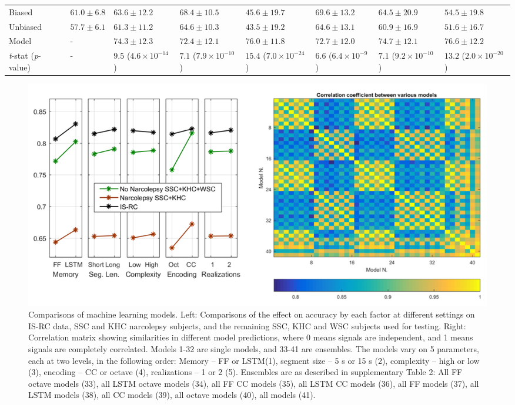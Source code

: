 \begin{landscape}
\begin{table}
\begin{tabular}{@{}llllllll@{}}
        \quad Biased                       & $61.0\pm6.8$ & $63.6\pm12.2$          & $68.4\pm10.5$          & $45.6\pm19.7$           & $69.6\pm13.2$         & $64.5\pm20.9$          & $54.5\pm19.8$           \\
        \quad Unbiased                     & $57.7\pm6.1$ & $61.3\pm11.2$          & $64.6\pm10.3$          & $43.5\pm19.2$           & $64.6\pm13.1$         & $60.9\pm16.9$          & $51.6\pm16.7$           \\
        \quad Model                        & -            & $74.3\pm12.3$          & $72.4\pm12.1$          & $76.0\pm11.8$           & $72.7\pm12.0$         & $74.7\pm12.1$          & $76.6\pm12.2$           \\
        \textit{t}-stat (\textit{p}-value) & -            & $9.5$ ($4.6\times10^{-14}$) & $7.1$ ($7.9\times10^{-10}$) & $15.4$ ($7.0\times10^{-24}$) & $6.6$ ($6.4\times10^{-9}$) & $7.1$ ($9.2\times10^{-10}$) & $13.2$ ($2.0\times10^{-20}$) \\ \bottomrule
    \end{tabular}
\end{table}
\end{landscape}

\begin{figure}
    \centering
    \includegraphics[width=\textwidth]{figures/paper-iii/SuppFigure_1.png}
    \caption[Comparisons of machine learning models]{Comparisons of machine learning models. Left: Comparisons of the effect on accuracy by each factor at different settings on IS-RC data, SSC and KHC narcolepsy subjects, and the remaining SSC, KHC and WSC subjects used for testing. Right: Correlation matrix showing similarities in different model predictions, where 0 means signals are independent, and 1 means signals are completely correlated. Models 1-32 are single models, and 33-41 are ensembles. The models vary on 5 parameters, each at two levels, in the following order: Memory – FF or LSTM(1), segment size – 5 s or 15 s (2), complexity – high or low (3), encoding – CC or octave (4), realizations – 1 or 2 (5). Ensembles are as described in supplementary Table 2: All FF octave models (33), all LSTM octave models (34), all FF CC models (35), all LSTM CC models (36), all FF models (37), all LSTM models (38), all CC models (39), all octave models (40), all models (41).}
    \label{fig:paperiii-suppfigure01}
\end{figure}
